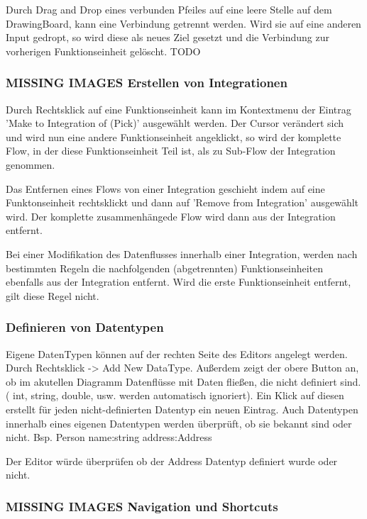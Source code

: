 	Durch Drag and Drop eines verbunden Pfeiles auf eine leere Stelle auf dem
	DrawingBoard, kann eine Verbindung getrennt werden. Wird sie auf eine
	anderen Input gedropt, so wird diese als neues Ziel gesetzt und die 
	Verbindung zur vorherigen Funktionseinheit gelöscht. TODO
	
\subsubsection{	MISSING IMAGES Erstellen von Integrationen}

	Durch Rechtsklick auf eine Funktionseinheit kann im Kontextmenu der Eintrag
	'Make to Integration of (Pick)' ausgewählt werden. Der Cursor verändert
	sich und wird nun eine andere Funktionseinheit angeklickt, so wird der
	komplette Flow, in der diese Funktionseinheit Teil ist, als zu
	Sub-Flow der Integration genommen.
	
	Das Entfernen eines Flows von einer Integration geschieht indem auf eine
	Funktonseinheit rechtsklickt und dann auf 'Remove from Integration'
	ausgewählt wird. Der komplette zusammenhängede Flow wird dann aus der
	Integration entfernt. 
	
	
	Bei einer Modifikation des Datenflusses innerhalb einer Integration, werden nach
	bestimmten Regeln die nachfolgenden (abgetrennten) Funktionseinheiten
	ebenfalls aus der Integration entfernt. Wird die erste Funktionseinheit
	entfernt, gilt diese Regel nicht.
	
	\subsubsection{Definieren von Datentypen}

	Eigene DatenTypen können auf der rechten Seite des Editors angelegt werden.
	Durch Rechtsklick -> Add New DataType. Außerdem zeigt der obere Button an,
	ob im akutellen Diagramm Datenflüsse mit Daten fließen, die nicht definiert
	sind. ( int, string, double, usw. werden automatisch ignoriert). Ein Klick
	auf diesen erstellt für jeden nicht-definierten Datentyp ein neuen Eintrag.
	Auch Datentypen innerhalb eines eigenen Datentypen werden überprüft, ob sie 
	bekannt sind oder nicht. Bsp. 
	Person 
	name:string
	address:Address  
	
	Der Editor würde überprüfen ob der Address Datentyp definiert wurde oder nicht.
	
\subsubsection{MISSING IMAGES Navigation und Shortcuts}

